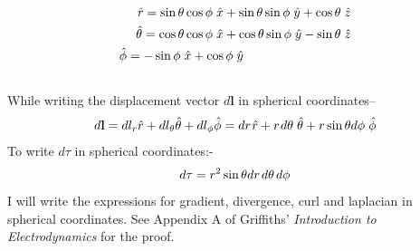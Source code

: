 \documentclass[12pt]{article}
\begin{document}
\begin{align}
    \hat{r} =\sin\theta\cos\phi\hspace{0.1cm}\hat{x}+\sin\theta\sin\phi\hspace{0.1cm}\hat{y}+\cos\theta\hspace{0.1cm}\hat{z} \\
    \hat{\theta} =\cos\theta\cos\phi\hspace{0.1cm}\hat{x}+\cos\theta\sin\phi\hspace{0.1cm}\hat{y}-\sin\theta\hspace{0.1cm}\hat{z} \\
    \hat{\phi} = -\sin\phi\hspace{0.1cm}\hat{x}+\cos\phi\hspace{0.1cm}\hat{y}\hspace{3cm} \\ \notag
\end{align}
While writing the displacement vector $d\mathbf{l}$ in spherical coordinates--
\begin{align}
    d\mathbf{l}= dl_{r}\hat{r}+dl_{\theta}\hat{\theta}+dl_{\phi}\hat{\phi} = dr\hspace{0.03cm}\hat{r}+ r\hspace{0.03cm}d\theta\hspace{0.1cm}\hat{\theta}+r\sin\theta d\phi \hspace{0.1cm}\hat{\phi}
\end{align} 
To write $d\tau$ in spherical coordinates:- 
\begin{align}
    d\tau=r^2 \sin\theta dr\hspace{0.05cm}d\theta\hspace{0.05cm}d\phi
\end{align}
I will write the expressions for gradient, divergence, curl and laplacian in spherical coordinates. See Appendix A of Griffiths' \textit{Introduction to Electrodynamics} for the proof.
\end{document}
